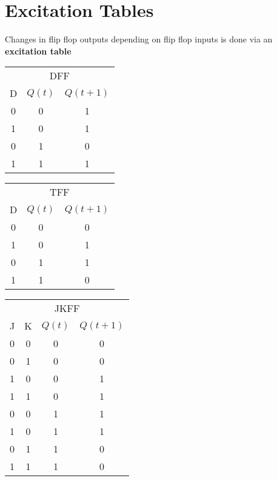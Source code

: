 \documentclass[12pt]{report}
\begin{document}
	\section{Excitation Tables}
		Changes in flip flop outputs depending on flip flop inputs is done via an \textbf{excitation table}\\
		\begin{tabular}{ c | c c}
			\multicolumn{3}{c}{DFF}\\
			D & $Q(t)$ & $Q(t+1)$\\
			\hline
			0 & 0 & 1 \\
			1 & 0 & 1 \\
			0 & 1 & 0 \\
			1 & 1 & 1 \\
		\end{tabular}
		 \hfill
		\begin{tabular}{ c | c c}
			\multicolumn{3}{c}{TFF}\\
			D & $Q(t)$ & $Q(t+1)$\\
			\hline
			0 & 0 & 0 \\
			1 & 0 & 1 \\
			0 & 1 & 1 \\
			1 & 1 & 0 \\
		\end{tabular} 
		\hfill
		\begin{tabular}{ c  c | c c}
			\multicolumn{4}{c}{JKFF}\\
			J & K & $Q(t)$ & $Q(t+1)$\\
			\hline
			0 & 0 & 0 & 0 \\
			0 & 1 & 0 & 0 \\
			1 & 0 & 0 & 1 \\
			1 & 1 & 0 & 1 \\
			0 & 0 & 1 & 1 \\
			1 & 0 & 1 & 1 \\
			0 & 1 & 1 & 0 \\
			1 & 1 & 1 & 0 \\
		\end{tabular}									
\end{document}
